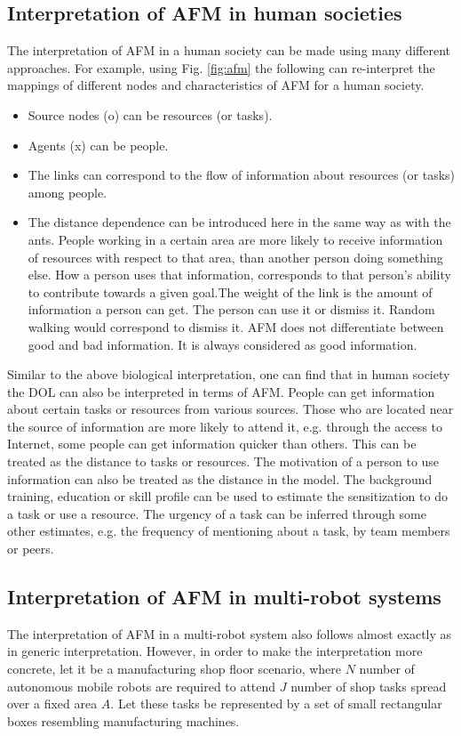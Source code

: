 \subsection{Interpretation of AFM in  human societies}
The interpretation of AFM  in a human society can be made using many different approaches. For example, using Fig. \ref{fig:afm} the following can re-interpret the mappings of different nodes and characteristics of AFM for a human society.
\begin{itemize}
\item Source nodes (o) can be resources (or tasks).
\item Agents (x) can be people.
\item The links can correspond to the flow of information about resources (or tasks) among people.
\item The distance dependence can be introduced here in the same way as with the ants. People working in a certain area are more likely to receive information of resources with respect to that area, than another person doing something else. How a person uses that information, corresponds to that person's ability to contribute towards a given goal.The weight of the link is the amount of information a person can get. The person can use it or dismiss it. Random walking would correspond to dismiss it. AFM does not differentiate between good and bad information. It is always considered as good information. 
\end{itemize}
Similar to the above biological interpretation, one can find that in human society the DOL can also be interpreted in terms of AFM. People can get information about certain tasks or resources from various sources. Those who are located near the source of information are more likely to attend it, e.g. through the access to Internet, some people can get information quicker than others. This can be treated as the distance to tasks or resources. The motivation of a person to use information can also be treated as the distance in the model. The background training, education or skill profile can be used to estimate the sensitization to do a task or use a resource. The urgency of a task can be inferred through some other estimates, e.g. the frequency of mentioning about a task, by team members or peers.
\subsection{Interpretation of AFM in multi-robot systems}
\label{afm:mrs-interpretation}
The interpretation of AFM in a multi-robot system also follows almost exactly as in generic interpretation. However, in order to make the interpretation more concrete, let it be a manufacturing shop floor scenario, where $N$ number of autonomous mobile robots are required to attend $J$ number of shop tasks spread over a fixed area $A$. Let these tasks be represented by a set of small rectangular boxes resembling  manufacturing machines.

